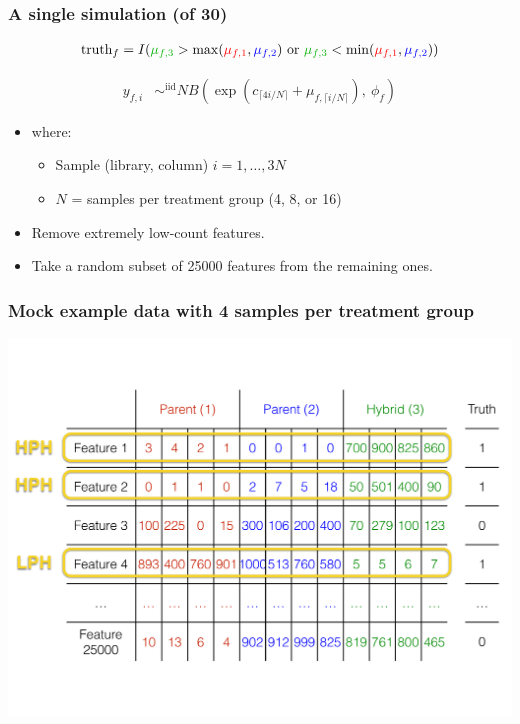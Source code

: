 \documentclass{beamer}
\numberwithin{equation}{section}
\begin{document}
\begin{frame}
\frametitle{A single simulation (of 30)}
\begin{align*}
\text{truth}_f &= I({\color{darkgreen}\mu_{f, 3}} > \max({\color{red}\mu_{f, 1}}, {\color{blue}\mu_{f, 2}}) \text{ or } {\color{darkgreen}\mu_{f, 3}} < \min({\color{red}\mu_{f, 1}}, {\color{blue}\mu_{f, 2}})) \\
\end{align*}

\pause \begin{align*}
y_{f, i} &\mathop{\sim}^{\text{iid}} NB\left (\exp \left ( c_{\lceil 4i/N \rceil} + \mu_{f, \lceil i/N \rceil} \right ), \ \phi_f  \right )
\end{align*}

\begin{itemize}
\item where:
\begin{itemize}
\item Sample (library, column) $i = 1, \ldots, 3N$ 
\item $N$ = samples per treatment group (4, 8, or 16)
\end{itemize}
\pause \item Remove extremely low-count features.
\pause \item Take a random subset of 25000 features from the remaining ones.
\end{itemize}
\end{frame}

\begin{frame}
\frametitle{Mock example data with 4 samples per treatment group}
\begin{center}
\includegraphics[scale=.28]{data}
\end{center}
\end{frame}
\end{document}

